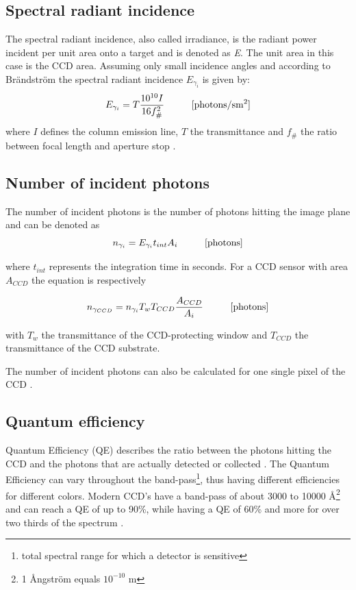 \subsection{Spectral radiant incidence}
The spectral radiant incidence, also called irradiance, is the radiant power incident per unit area onto a target and is denoted as \textit{E}. The unit area in this case is the CCD area.
Assuming only small incidence angles and according to Brändström \citep{brandstrom2003auroral} the spectral radiant incidence $E_{\gamma_i}$ is given by:
\begin{equation}
\centering
	\label{eq:irradiance}
	E_{\gamma_i} = T \frac{10^{10}I}{16 {f_{\#}^{2}}} 		
	\hspace{10mm} \si{[{photons} \per\second\meter\squared]}
\end{equation}
where $I$ defines the column emission line, $T$ the transmittance and  $f_{\#}$ the ratio between focal length and aperture stop \citep{brandstrom2003auroral}.



\subsection{Number of incident photons}
The number of incident photons is the number of photons hitting the image plane and can be denoted as
\begin{equation}
\centering
	\label{eq:irradiance}
	n_{\gamma_i} = E_{\gamma_i} t_{int} A_i
	\hspace{10mm} \si{[{photons}]}
\end{equation}

where $t_{int}$ represents the integration time in seconds.
For a CCD sensor with area $A_{CCD}$ the equation is respectively

\begin{equation}
\centering
	\label{eq:irradiance}
	n_{\gamma_{CCD}} = n_{\gamma_i} T_w T_{CCD} \frac{A_{CCD}}{A_i}
	\hspace{10mm} \si{[{photons}]}
\end{equation}

with $T_w$ the transmittance of the CCD-protecting window and $T_{CCD}$ the transmittance of the CCD substrate.

The number of incident photons can also be calculated for one single pixel of the CCD \citep{brandstrom2003auroral}.


\subsection{Quantum efficiency}
Quantum Efficiency (QE) describes the ratio between the photons hitting the CCD and the photons that are actually detected or collected \citep{hoymorksensors}. The Quantum Efficiency can vary throughout the band-pass\footnote{total spectral range for which a detector is sensitive}, thus having different efficiencies for different colors. Modern CCD's have a band-pass of about 3000 to 10000 Å\footnote{1 {Ångström} equals $10^{-10}$ m} and can reach a QE of up to 90\%, while having a QE of 60\% and more for over two thirds of the spectrum \citep{howellCCD}.

